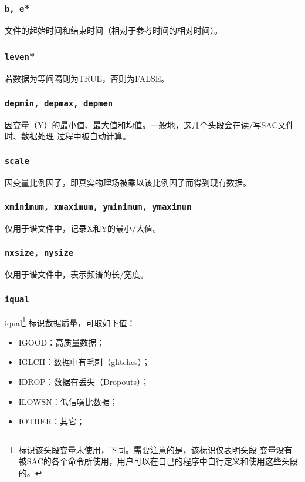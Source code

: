 \subsubsection{\texttt{b, e}*}
文件的起始时间和结束时间（相对于参考时间的相对时间）。

\subsubsection{\texttt{leven}*}
若数据为等间隔则为TRUE，否则为FALSE。

\subsubsection{\texttt{depmin, depmax, depmen}}
因变量（Y）的最小值、最大值和均值。一般地，这几个头段会在读/写SAC文件时、数据处理
过程中被自动计算。

\subsubsection{\texttt{scale}}
因变量比例因子，即真实物理场被乘以该比例因子而得到现有数据。

\subsubsection{\texttt{xminimum, xmaximum, yminimum, ymaximum}}
仅用于谱文件中，记录X和Y的最小/大值。

\subsubsection{\texttt{nxsize, nysize}}
仅用于谱文件中，表示频谱的长/宽度。

\subsubsection{\texttt{iqual}\dag}
iqual\footnote{\dag 标识该头段变量未使用，下同。需要注意的是，该标识仅表明头段
变量没有被SAC的各个命令所使用，用户可以在自己的程序中自行定义和使用这些头段的。}
标识数据质量，可取如下值：
\begin{itemize}
\ttfamily
\item IGOOD：高质量数据；
\item IGLCH：数据中有毛刺（glitches）；
\item IDROP：数据有丢失（Dropouts）；
\item ILOWSN：低信噪比数据；
\item IOTHER：其它；
\end{itemize}


